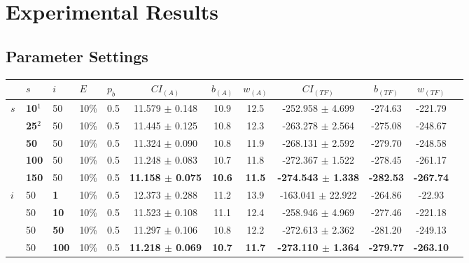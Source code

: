 \chapter{Experimental Results}
\label{appendixC}

\section{Parameter Settings}

\begin{sidewaystable}
    \begin{tabular}{|l|l|l|l|l||c|c|c|c|c|c|c|}
    \hline
    ~ & $s$ & $i$ & $E$ & $p_{b}$ & $CI_{(A)}$ & $b_{(A)}$ & $w_{(A)}$ & $CI_{(TF)}$ & $b_{(TF)}$ & $w_{(TF)}$\\
    \hline
      $s$ & \textbf{10$^1$} & 50 & 10\% & 0.5 & 11.579 $\pm$ 0.148 & 10.9 & 12.5 & -252.958 $\pm$ 4.699& -274.63& -221.79 \\
    ~ & \textbf{25$^2$} & 50 & 10\% & 0.5  & 11.445 $\pm$ 0.125 & 10.8 & 12.3 & -263.278 $\pm$ 2.564 & -275.08 & -248.67  \\
    ~ & \textbf{50} & 50 & 10\% & 0.5  & 11.324 $\pm$ 0.090 & 10.8 & 11.9 & -268.131 $\pm$ 2.592 & -279.70 & -248.58\\
    ~ & \textbf{100} & 50 & 10\% & 0.5 & 11.248 $\pm$ 0.083 & 10.7 & 11.8 & -272.367 $\pm$ 1.522 & -278.45 & -261.17\\
    ~ & \textbf{150} & 50 & 10\% & 0.5  & \textbf{11.158 $\pm$ 0.075} & \textbf{10.6} & \textbf{11.5} & \textbf{-274.543 $\pm$ 1.338} & \textbf{-282.53} & \textbf{-267.74}\\
    \hline
    $i$ & 50 & \textbf{1} & 10\% & 0.5  & 12.373 $\pm$ 0.288 & 11.2 & 13.9& -163.041 $\pm$ 22.922 & -264.86 & -22.93  \\
    ~   & 50 &\textbf{10} & 10\% & 0.5  & 11.523 $\pm$ 0.108 & 11.1 & 12.4 & -258.946 $\pm$ 4.969 & -277.46& -221.18 \\
    ~   & 50 &\textbf{50} & 10\% & 0.5  & 11.297 $\pm$ 0.106 & 10.8 & 12.2 & -272.613 $\pm$ 2.362 & -281.20 & -249.13 \\
    ~   & 50 &\textbf{100} & 10\% & 0.5 & \textbf{11.218 $\pm$ 0.069} & \textbf{10.7} & \textbf{11.7} & \textbf{-273.110 $\pm$ 1.364} & \textbf{-279.77} & \textbf{-263.10} \\

\end{tabular}
\end{sidewaystable}
